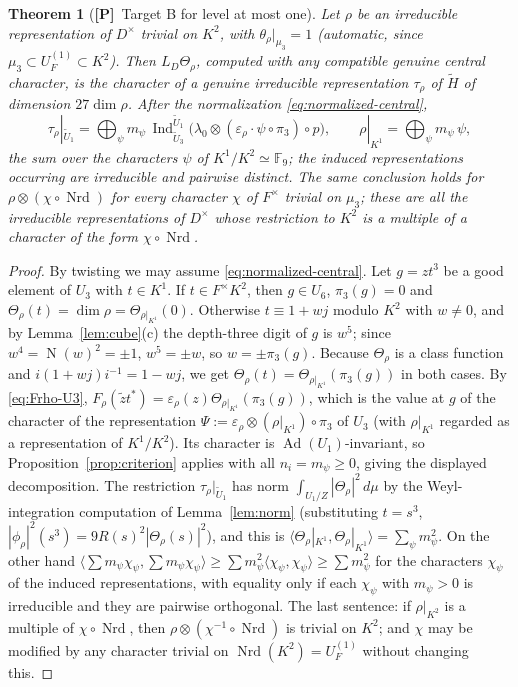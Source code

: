 \documentclass[11pt]{article}
\newcommand{\Fq}{\mathbb F}
\newcommand{\Nm}{\operatorname N}
\newcommand{\Nrd}{\operatorname{Nrd}}
\newcommand{\Ind}{\operatorname{Ind}}
\newcommand{\Ad}{\operatorname{Ad}}
\newcommand{\tH}{\widetilde H}
\newcommand{\tU}{\widetilde U}
\newcommand{\Ptag}{\textnormal{\textbf{[P]}}}
\theoremstyle{plain}
\newtheorem{theorem}{Theorem}[section]
\theoremstyle{definition}
\begin{document}
\begin{theorem}[\Ptag\ Target B for level at most one]\label{thm:levelone}
Let $\rho$ be an irreducible representation of $D^\times$ trivial on
$K^2$, with $\theta_\rho|_{\mu_3}=1$ (automatic, since $\mu_3\subset U_F^{(1)}\subset K^2$).
Then $L_D\Theta_\rho$, computed with any compatible genuine central
character, is the character of a genuine irreducible representation
$\tau_\rho$ of $\tH$ of dimension $27\dim\rho$.  After the normalization
\eqref{eq:normalized-central},
\[
 \tau_\rho|_{\tU_1}=\bigoplus_{\psi}m_\psi\,\Ind_{\tU_3}^{\tU_1}\bigl(\lambda_0\otimes(\varepsilon_\rho\cdot\psi\circ\pi_3)\circ p\bigr),
 \qquad \rho|_{K^1}=\bigoplus_\psi m_\psi\,\psi ,
\]
the sum over the characters $\psi$ of $K^1/K^2\simeq\Fq_9$; the
induced representations occurring are irreducible and pairwise
distinct.
The same conclusion holds for $\rho\otimes(\chi\circ\Nrd)$ for every
character $\chi$ of $F^\times$ trivial on $\mu_3$; these are all the
irreducible representations of $D^\times$ whose restriction to $K^2$
is a multiple of a character of the form $\chi\circ\Nrd$.
\end{theorem}
\begin{proof}
By twisting we may assume \eqref{eq:normalized-central}.  Let $g=zt^3$
be a good element of $U_3$ with $t\in K^1$.  If $t\in F^\times K^2$, then
$g\in U_6$, $\pi_3(g)=0$ and $\Theta_\rho(t)=\dim\rho=\Theta_{\rho|_{K^1}}(0)$.
Otherwise $t\equiv1+wj$ modulo $K^2$ with $w\ne0$, and by
Lemma~\ref{lem:cube}(c) the depth-three digit of $g$ is $w^5$; since
$w^4=\Nm(w)^2=\pm1$, $w^5=\pm w$, so $w=\pm\pi_3(g)$.  Because
$\Theta_\rho$ is a class function and $i(1+wj)i^{-1}=1-wj$, we get
$\Theta_\rho(t)=\Theta_{\rho|_{K^1}}(\pi_3(g))$ in both cases.  By
\eqref{eq:Frho-U3}, $F_\rho(\tilde zt^*)=\varepsilon_\rho(z)\Theta_{\rho|_{K^1}}(\pi_3(g))$,
which is the value at $g$ of the character of the representation
$\Psi:=\varepsilon_\rho\otimes(\rho|_{K^1})\circ\pi_3$ of $U_3$ (with
$\rho|_{K^1}$ regarded as a representation of $K^1/K^2$).  Its character
is $\Ad(U_1)$-invariant, so Proposition~\ref{prop:criterion} applies
with all $n_i=m_\psi\ge0$, giving the displayed decomposition.
The restriction $\tau_\rho|_{\tU_1}$ has norm
$\int_{U_1/Z}|\Theta_\rho|^2\,d\mu$ by the Weyl-integration computation
of Lemma~\ref{lem:norm} (substituting $t=s^3$, $|\phi_\rho|^2(s^3)=9R(s)^2|\Theta_\rho(s)|^2$),
and this is $\langle\Theta_\rho|_{K^1},\Theta_\rho|_{K^1}\rangle=\sum_\psi m_\psi^2$.
On the other hand $\langle\sum m_\psi\chi_\psi,\sum m_\psi\chi_\psi\rangle\ge\sum m_\psi^2\langle\chi_\psi,\chi_\psi\rangle\ge\sum m_\psi^2$
for the characters $\chi_\psi$ of the induced representations, with
equality only if each $\chi_\psi$ with $m_\psi>0$ is irreducible and
they are pairwise orthogonal.  The last sentence: if $\rho|_{K^2}$ is a multiple of
$\chi\circ\Nrd$, then $\rho\otimes(\chi^{-1}\circ\Nrd)$ is trivial on
$K^2$; and $\chi$ may be modified by any character trivial on
$\Nrd(K^2)=U_F^{(1)}$ without changing this.
\end{proof}
\end{document}
